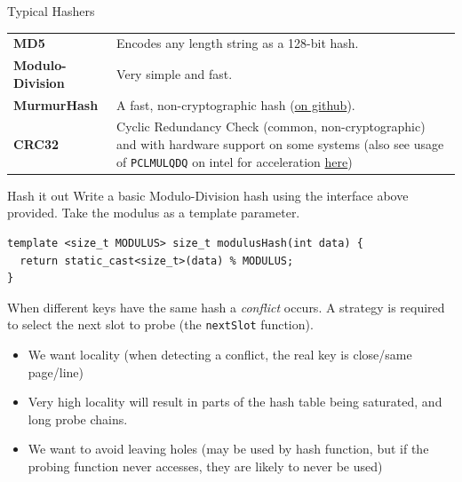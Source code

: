 \begin{sidenotebox}{Typical Hashers}
    \begin{center}
        \begin{tabular}{l p{}}
            \textbf{MD5}             & Encodes any length string as a 128-bit hash.                                                                                                                                                                                                                                                                                \\
            \textbf{Modulo-Division} & Very simple and fast.                                                                                                                                                                                                                                                                                                       \\
            \textbf{MurmurHash}      & A fast, non-cryptographic hash (\href{https://github.com/aappleby/smhasher}{on github}).                                                                                                                                                                                                                                    \\
            \textbf{CRC32}           & Cyclic Redundancy Check (common, non-cryptographic) and with hardware support on some systems (also see usage of \texttt{PCLMULQDQ} on intel for acceleration \href{https://www.intel.com/content/dam/www/public/us/en/documents/white-papers/fast-crc-computation-generic-polynomials-pclmulqdq-paper.pdf}{here})
        \end{tabular}
    \end{center}
\end{sidenotebox}
\begin{examplebox}{Hash it out}
    Write a basic Modulo-Division hash using the interface above provided. Take the modulus as a template parameter.
    \tcblower
    \begin{verbatim}
template <size_t MODULUS> size_t modulusHash(int data) {
  return static_cast<size_t>(data) % MODULUS;
}
    \end{verbatim}
\end{examplebox}
When different keys have the same hash a \textit{conflict} occurs. A strategy is required to select the next slot to probe (the \texttt{nextSlot} function).
\begin{itemize}
    \item We want locality (when detecting a conflict, the real key is close/same page/line)
    \item Very high locality will result in parts of the hash table being saturated, and long probe chains.
    \item We want to avoid leaving holes (may be used by hash function, but if the probing function never accesses, they are likely to never be used)
\end{itemize}


